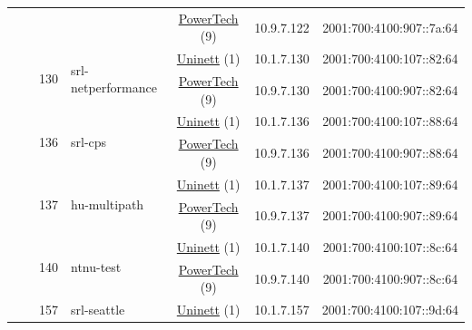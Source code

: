 \begin{small}
\begin{center}
\begin{longtable}{|c|c|c|c|c|c|c|c|}
  &  &  &  & \multicolumn{2}{|c|}{\tiny{\href{http://www.powertech.no}{PowerTech} (9)}} & \tiny{10.9.7.122} & \tiny{2001:700:4100:907::7a:64} \\* \cline{3-3}\cline{4-4}\cline{5-5}\cline{6-6}\cline{7-7}\cline{8-8}
  &  & \multirow{2}{*}{\tiny{130}} & \multicolumn{1}{|l|}{\multirow{2}{*}{\tiny{srl-netperformance}}} & \multicolumn{2}{|c|}{\tiny{\href{https://www.uninett.no}{Uninett} (1)}} & \tiny{10.1.7.130} & \tiny{2001:700:4100:107::82:64} \\* \cline{5-5}\cline{6-6}\cline{7-7}\cline{8-8}
  &  &  &  & \multicolumn{2}{|c|}{\tiny{\href{http://www.powertech.no}{PowerTech} (9)}} & \tiny{10.9.7.130} & \tiny{2001:700:4100:907::82:64} \\* \cline{3-3}\cline{4-4}\cline{5-5}\cline{6-6}\cline{7-7}\cline{8-8}
  &  & \multirow{2}{*}{\tiny{136}} & \multicolumn{1}{|l|}{\multirow{2}{*}{\tiny{srl-cps}}} & \multicolumn{2}{|c|}{\tiny{\href{https://www.uninett.no}{Uninett} (1)}} & \tiny{10.1.7.136} & \tiny{2001:700:4100:107::88:64} \\* \cline{5-5}\cline{6-6}\cline{7-7}\cline{8-8}
  &  &  &  & \multicolumn{2}{|c|}{\tiny{\href{http://www.powertech.no}{PowerTech} (9)}} & \tiny{10.9.7.136} & \tiny{2001:700:4100:907::88:64} \\* \cline{3-3}\cline{4-4}\cline{5-5}\cline{6-6}\cline{7-7}\cline{8-8}
  &  & \multirow{2}{*}{\tiny{137}} & \multicolumn{1}{|l|}{\multirow{2}{*}{\tiny{hu-multipath}}} & \multicolumn{2}{|c|}{\tiny{\href{https://www.uninett.no}{Uninett} (1)}} & \tiny{10.1.7.137} & \tiny{2001:700:4100:107::89:64} \\* \cline{5-5}\cline{6-6}\cline{7-7}\cline{8-8}
  &  &  &  & \multicolumn{2}{|c|}{\tiny{\href{http://www.powertech.no}{PowerTech} (9)}} & \tiny{10.9.7.137} & \tiny{2001:700:4100:907::89:64} \\* \cline{3-3}\cline{4-4}\cline{5-5}\cline{6-6}\cline{7-7}\cline{8-8}
  &  & \multirow{2}{*}{\tiny{140}} & \multicolumn{1}{|l|}{\multirow{2}{*}{\tiny{ntnu-test}}} & \multicolumn{2}{|c|}{\tiny{\href{https://www.uninett.no}{Uninett} (1)}} & \tiny{10.1.7.140} & \tiny{2001:700:4100:107::8c:64} \\* \cline{5-5}\cline{6-6}\cline{7-7}\cline{8-8}
  &  &  &  & \multicolumn{2}{|c|}{\tiny{\href{http://www.powertech.no}{PowerTech} (9)}} & \tiny{10.9.7.140} & \tiny{2001:700:4100:907::8c:64} \\* \cline{3-3}\cline{4-4}\cline{5-5}\cline{6-6}\cline{7-7}\cline{8-8}
  &  & \multirow{2}{*}{\tiny{157}} & \multicolumn{1}{|l|}{\multirow{2}{*}{\tiny{srl-seattle}}} & \multicolumn{2}{|c|}{\tiny{\href{https://www.uninett.no}{Uninett} (1)}} & \tiny{10.1.7.157} & \tiny{2001:700:4100:107::9d:64} \\* \cline{5-5}\cline{6-6}\cline{7-7}\cline{8-8}

\end{longtable}
\end{center}
\end{small}
